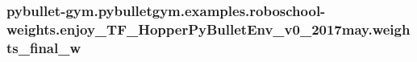 \subsubsection[{\texorpdfstring{weights\+\_\+final\+\_\+w}{weights_final_w}}]{\setlength{\rightskip}{0pt plus 5cm}pybullet-\/gym.\+pybulletgym.\+examples.\+roboschool-\/weights.\+enjoy\+\_\+\+T\+F\+\_\+\+Hopper\+Py\+Bullet\+Env\+\_\+v0\+\_\+2017may.\+weights\+\_\+final\+\_\+w}\hypertarget{namespacepybullet-gym_1_1pybulletgym_1_1examples_1_1roboschool-weights_1_1enjoy___t_f___hopper_py_bullet_env__v0__2017may_a4377d5334d1cd9a9028895a0fec0b1bf}{}\label{namespacepybullet-gym_1_1pybulletgym_1_1examples_1_1roboschool-weights_1_1enjoy___t_f___hopper_py_bullet_env__v0__2017may_a4377d5334d1cd9a9028895a0fec0b1bf}
